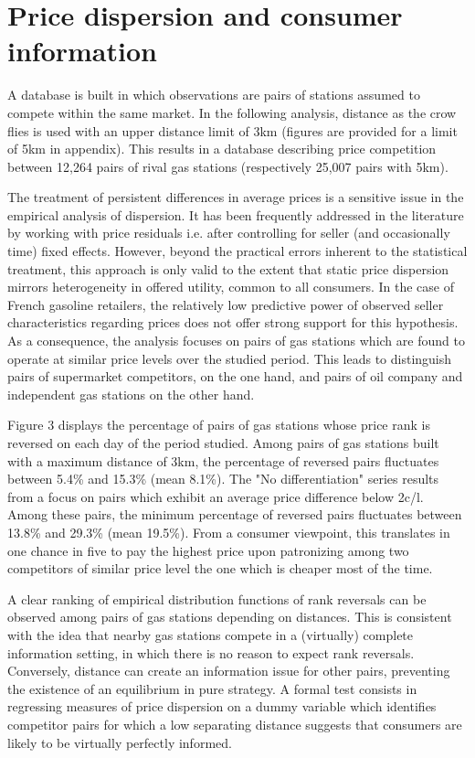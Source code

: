 \documentclass[english]{article}
\begin{document}
\section{Price dispersion and consumer information}

A database is built in which observations are pairs of stations assumed to compete within the same market. In the following analysis, distance as the crow flies is used with an upper distance limit of 3km (figures are provided for a limit of 5km in appendix). This results in a database describing price competition between 12,264 pairs of rival gas stations (respectively 25,007 pairs with 5km).

The treatment of persistent differences in average prices is a sensitive issue in the empirical analysis of dispersion. It has been frequently addressed in the literature by working with price residuals i.e. after controlling for seller (and occasionally time) fixed effects. However, beyond the practical errors inherent to the statistical treatment, this approach is only valid to the extent that static price dispersion mirrors heterogeneity in offered utility, common to all consumers. In the case of French gasoline retailers, the relatively low predictive power of observed seller characteristics regarding prices does not offer strong support for this hypothesis. As a consequence, the analysis focuses on pairs of gas stations which are found to operate at similar price levels over the studied period. This leads to distinguish pairs of supermarket competitors, on the one hand, and pairs of oil company and independent gas stations on the other hand.

Figure 3 displays the percentage of pairs of gas stations whose price rank is reversed on each day of the period studied. Among pairs of gas stations built with a maximum distance of 3km, the percentage of reversed pairs fluctuates between 5.4\% and 15.3\%  (mean 8.1\%). The "No differentiation" series results from a focus on pairs which exhibit an average price difference below 2c/l. Among these pairs, the minimum percentage of reversed pairs fluctuates between 13.8\% and 29.3\% (mean 19.5\%). From a consumer viewpoint, this translates in one chance in five to pay the highest price upon patronizing among two competitors of similar price level the one which is cheaper most of the time.

A clear ranking of empirical distribution functions of rank reversals can be observed among pairs of gas stations depending on distances. This is consistent with the idea that nearby gas stations compete in a (virtually) complete information setting, in which there is no reason to expect rank reversals. Conversely, distance can create an information issue for other pairs, preventing the existence of an equilibrium in pure strategy. A formal test consists in regressing measures of price dispersion on a dummy variable which identifies competitor pairs for which a low separating distance suggests that consumers are likely to be virtually perfectly informed.
\end{document}
